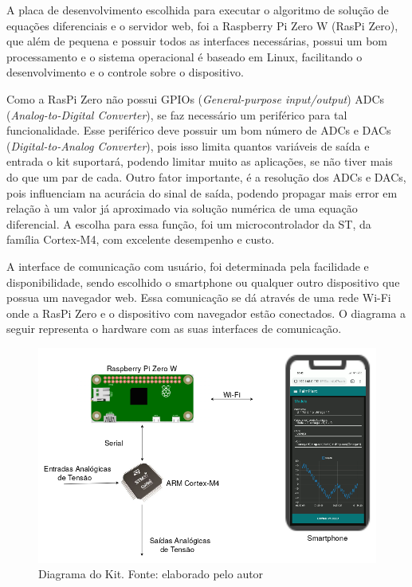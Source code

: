 \documentclass[journal]{IEEEtranTIE}
\begin{document}
A placa de desenvolvimento escolhida para executar o algoritmo de solução de equações diferenciais e o servidor web, foi a Raspberry Pi Zero W (RasPi Zero), que além de pequena e possuir todos as interfaces necessárias, possui um bom processamento e o sistema operacional é baseado em Linux, facilitando o desenvolvimento e o controle sobre o dispositivo.

Como a RasPi Zero não possui GPIOs (\textit{General-purpose input/output}) ADCs (\textit{Analog-to-Digital Converter}), se faz necessário um periférico para tal funcionalidade. Esse periférico deve possuir um bom número de ADCs e DACs (\textit{Digital-to-Analog Converter}), pois isso limita quantos variáveis de saída e entrada o kit suportará, podendo limitar muito as aplicações, se não tiver mais do que um par de cada. Outro fator importante, é a resolução dos ADCs e DACs, pois influenciam na acurácia do sinal de saída, podendo propagar mais error em relação à um valor já aproximado via solução numérica de uma equação diferencial. A escolha para essa função, foi um microcontrolador da ST, da família Cortex-M4, com excelente desempenho e custo.

A interface de comunicação com usuário, foi determinada pela facilidade e disponibilidade, sendo escolhido o smartphone ou qualquer outro dispositivo que possua um navegador web. Essa comunicação se dá através de uma rede Wi-Fi onde a RasPi Zero e o dispositivo com navegador estão conectados. O diagrama a seguir representa o hardware com as suas interfaces de comunicação.

\begin{figure}[H]
	\includegraphics[width=\linewidth]{img/diagrama.png}
    \caption{Diagrama do Kit. Fonte: elaborado pelo autor}
    \label{fig:real}
\end{figure}
\end{document}
